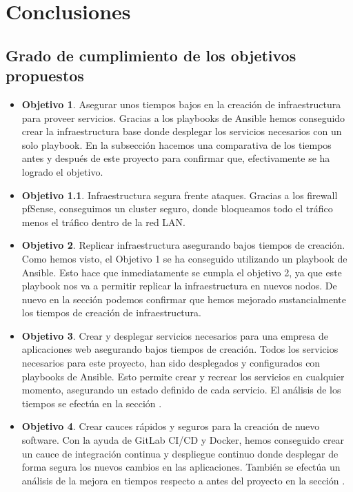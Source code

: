 \chapter {Conclusiones}

\section{Grado de cumplimiento de los objetivos propuestos}
\begin{itemize}
	\item \textbf{Objetivo 1}. Asegurar unos tiempos bajos en la creación de infraestructura para proveer servicios. Gracias a los playbooks de Ansible hemos conseguido crear la infraestructura base donde desplegar los servicios necesarios con un solo playbook. En la subsección  hacemos una comparativa de los tiempos antes y después de este proyecto para confirmar que, efectivamente se ha logrado el objetivo.
	\item \textbf{Objetivo 1.1}. Infraestructura segura frente ataques. Gracias a los firewall pfSense, conseguimos un cluster seguro, donde bloqueamos todo el tráfico menos el tráfico dentro de la red LAN. 
	\item \textbf{Objetivo 2}. Replicar infraestructura asegurando bajos tiempos de creación. Como hemos visto, el Objetivo 1 se ha conseguido utilizando un playbook de Ansible. Esto hace que inmediatamente se cumpla el objetivo 2, ya que este playbook nos va a permitir replicar la infraestructura en nuevos nodos. De nuevo en la sección  podemos confirmar que hemos mejorado sustancialmente los tiempos de creación de infraestructura.
	\item \textbf{Objetivo 3}. Crear y desplegar servicios necesarios para una empresa de aplicaciones web asegurando bajos tiempos de creación. Todos los servicios necesarios para este proyecto, han sido desplegados y configurados con playbooks de Ansible. Esto permite crear y recrear los servicios en cualquier momento, asegurando un estado definido de cada servicio. El análisis de los tiempos se efectúa en la sección .
	\item \textbf{Objetivo 4}. Crear cauces rápidos y seguros para la creación de nuevo software. Con la ayuda de GitLab CI/CD y Docker, hemos conseguido crear un cauce de integración continua y despliegue continuo donde desplegar de forma segura los nuevos cambios en las aplicaciones. También se efectúa un análisis de la mejora en tiempos respecto a antes del proyecto en la sección .
\end{itemize}

